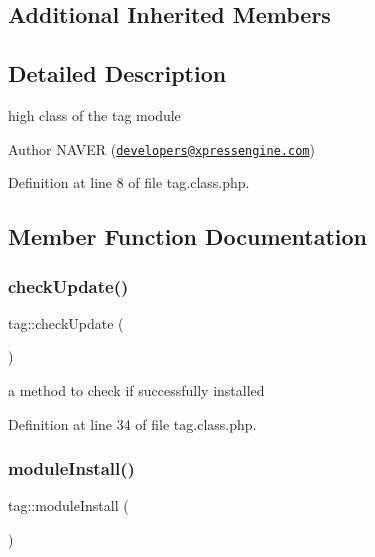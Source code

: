 \subsection*{Additional Inherited Members}


\subsection{Detailed Description}
high class of the tag module 

\begin{DoxyAuthor}{Author}
N\+A\+V\+ER (\href{mailto:developers@xpressengine.com}{\tt developers@xpressengine.\+com}) 
\end{DoxyAuthor}


Definition at line 8 of file tag.\+class.\+php.



\subsection{Member Function Documentation}
\hypertarget{classtag_ab8fa1f64862dc89a3a7455ba983a2a34}{}\label{classtag_ab8fa1f64862dc89a3a7455ba983a2a34} 
\subsubsection{\texorpdfstring{check\+Update()}{checkUpdate()}}
{\footnotesize\ttfamily tag\+::check\+Update (\begin{DoxyParamCaption}{ }\end{DoxyParamCaption})}



a method to check if successfully installed 



Definition at line 34 of file tag.\+class.\+php.

\hypertarget{classtag_aa1d24f3693778a2b40dad2f24e8dbafe}{}\label{classtag_aa1d24f3693778a2b40dad2f24e8dbafe} 
\subsubsection{\texorpdfstring{module\+Install()}{moduleInstall()}}
{\footnotesize\ttfamily tag\+::module\+Install (\begin{DoxyParamCaption}{ }\end{DoxyParamCaption})}



